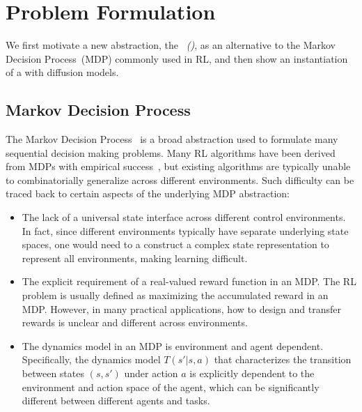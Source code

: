 \vspace{-8pt}
\section{Problem Formulation}
\vspace{-3pt}
\label{sec:background}
We first motivate a new abstraction, the \emph{\process~(\proc)}, as an alternative to the Markov Decision Process~(MDP) commonly used in RL, and then show an instantiation of a \proc with diffusion models.

\vspace{-5pt}
\subsection{Markov Decision Process}\label{subsec:mdp}
\vspace{-3pt}

The Markov Decision Process~\citep{puterman1994markov} is a broad abstraction used to formulate many sequential decision making problems.
Many RL algorithms have been derived from MDPs with empirical success~\citep{haarnoja2018soft,hafner2020mastering,zhang2022making}, but existing algorithms are typically unable to combinatorially generalize across different environments. Such difficulty %
can be traced back to certain aspects of the underlying MDP abstraction: %

\begin{itemize}[leftmargin=2em, nosep]
    \item[{\bf i)}] The lack of a universal state interface across different control environments. In fact, since different environments typically have separate underlying state spaces, one would need to a construct a complex state representation to represent all environments, making learning difficult.  
    \item[{\bf ii)}] The explicit requirement of a real-valued reward function in an MDP. The RL problem is usually defined as maximizing the accumulated reward in an MDP. However, in many practical applications, how to design and transfer rewards is unclear and different across environments.   
    \item[{\bf iii)}] The dynamics model in an MDP is environment and agent dependent. Specifically, the dynamics model $T(s'|s, a)$ that characterizes the transition between states $(s, s')$ under action $a$ is explicitly dependent to the environment and action space of the agent, which can be significantly different between different agents and tasks.
\end{itemize}

